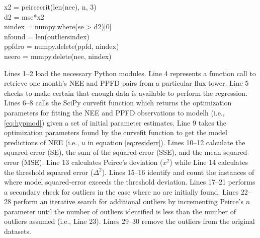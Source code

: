 { \indent \indent x2 = peirce\textunderscore crit(len(nee), n, 3)\\
 \indent \indent d2 = mse*x2\\
 \indent \indent n\textunderscore index = numpy.where(se > d2)[0]\\
 \indent \indent n\textunderscore found = 
                             len(outliers\textunderscore index)\\
 \indent ppfd\textunderscore ro = numpy.delete(ppfd, 
                     n\textunderscore index)\\
 \indent nee\textunderscore ro = numpy.delete(nee, 
                     n\textunderscore index)\\
}

\noindent Lines 1--2 load the necessary Python modules.  
Line 4 represents a function call to retrieve one month's NEE and PPFD pairs from a particular flux tower. 
Line 5 checks to make certain that enough data is available to perform the regression. 
Lines 6--8 calls the SciPy curve\textunderscore fit function which returns the optimization parameters for fitting the NEE and PPFD observations to model\textunderscore h (i.e., \ref{eq:hypmod}) given a set of initial parameter estimates.  
Line 9 takes the optimization parameters found by the curve\textunderscore fit function to get the model predictions of NEE (i.e., $u$ in equation \ref{eq:residerr}).  
Lines 10--12 calculate the squared-error (SE), the sum of the squared-error (SSE), and the mean squared-error (MSE).  
Line 13 calculates Peirce's deviation ($x^{2}$) while Line 14 calculates the threshold squared error ($\Delta^{2}$).  
Lines 15--16 identify and count the instances of where model squared-error exceeds the threshold deviation.  
Lines 17--21 performs a secondary check for outliers in the case where no are initially found.  
Lines 22--28 perform an iterative search for additional outliers by incrementing Peirce's $n$ parameter until the number of outliers identified is less than the number of outliers assumed (i.e., Line 23).  
Lines 29--30 remove the outliers from the original datasets. 

\newpage

